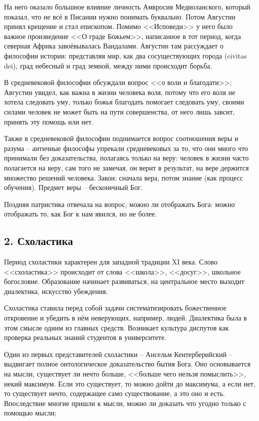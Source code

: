 \documentclass[a4paper, 12pt]{book} %
\begin{document}
На него оказало большное влияние личность Амвросия Медиоланского, который показал, что не всё в Писании нужно понимать буквально. Потом Августин принял крещение и стал епископом. Помимо <<Исповеди>> у него было важное произведение <<О граде Божьем>>, написанное в тот период, когда северная Африка завоёвывалась Вандалами. Августин там рассуждает о философии истории: представляя мир, как два сосуществующих города  (civitas dei), град небесный и град земной, между ними происходит борьба.

 В средневековой философии обсуждали вопрос <<о воли и благодати>>; Августин увидел, как важна в жизни человека воля, потому что его воля не хотела следовать уму, только божья благодать помогает следовать уму, своими силами человек не может быть на пути совершенства, от него лишь завсит, принять эту помощь или нет.
 
Также в средневековой философии поднимается вопрос соотношения веры и разума -- античные философы упрекали средневековых за то, что они много что принимали без доказательства, полагаясь только на веру: человек в жизни часто полагается на веру, сам того не замечая, он верит в результат, на вере держится множество решений человека. Закон: сначала вера, потом знание (как процесс обучения). Предмет веры -- бесконечный Бог.

Поздняя патристика отвечала на вопрос, можно ли отображать Бога: можно отображать то, как Бог к нам явился, но не более.


\subsection*{2. Схоластика}
Период схоластики характерен для западной традиции XI века.
Слово <<схоластика>> происходит от слова <<школа>>, <<досуг>>, школьное богословие. Образование начинает развиваться, на центральное место выходит диалектика, искусство убеждения.

Схоластика ставила перед собой задачи систематизировать божественное откровение и убедить в нём неверующих, например, людей. Диалектика была в этом смысле одинм из главных средств. Возникает культура диспутов как проверка реальных знаний студентов в университете.

Один из первых представителей схоластики -- Ансельм Кентерберийский -- выдвигает полное онтологическое доказательство бытия Бога. Оно основывается на мысли, существует ли нечто больше, <<больше чего нельзя помыслить>>, некий максимум. Если это существует, то можно дойти до максимума, а если нет, то существует нечто, содержащее само существование, а это оно и есть. Впоследствие многие пришли к мысли, можно ли доказать что угодно только с помощью мысли; 
\end{document}

